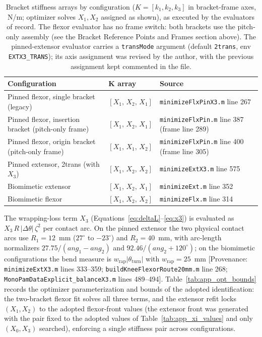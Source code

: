 \begin{table}[htbp]
\caption{Bracket stiffness arrays by configuration ($K = [k_{1}, k_{2}, k_{3}]$ in bracket-frame axes, N/m; optimizer solves $X_{1}, X_{2}$ assigned as shown), as executed by the evaluators of record. The flexor evaluator has no frame switch: both brackets use the pitch-only assembly (see the Bracket Reference Points and Frames section above). The pinned-extensor evaluator carries a \texttt{transMode} argument (default \texttt{2trans}, env \texttt{EXTX3\_TRANS}); its axis assignment was revised by the author, with the previous assignment kept commented in the file.}
\label{tab:app_stiffness_arrays}
\begin{tabular}{@{}lll@{}}
\toprule
\textbf{Configuration} & $\boldsymbol{K}$ array & \textbf{Source} \\
\midrule
Pinned flexor, single bracket (legacy)       & $[X_{1},\,X_{2},\,X_{1}]$ & \texttt{minimizeFlxPinX3.m} line 267 \\
Pinned flexor, insertion bracket (pitch-only frame)    & $[X_{1},\,X_{2},\,X_{1}]$ & \texttt{minimizeFlxPin.m} line 387 (frame line 289) \\
Pinned flexor, origin bracket (pitch-only frame) & $[X_{1},\,X_{1},\,X_{2}]$ & \texttt{minimizeFlxPin.m} line 400 (frame line 305) \\
Pinned extensor, 2trans (with $X_{3}$)      & $[X_{1},\,X_{2},\,X_{2}]$ & \texttt{minimizeExtX3.m} line 575 \\
Biomimetic extensor                 & $[X_{1},\,X_{2},\,X_{1}]$ & \texttt{minimizeExt.m} line 352 \\
Biomimetic flexor                   & $[X_{1},\,X_{2},\,X_{2}]$ & \texttt{minimizeFlx.m} line 314 \\
\bottomrule
\end{tabular}
\end{table}

The wrapping-loss term $X_{3}$ (Equations~\ref{eq:deltaL}--\ref{eq:x3}) is evaluated as $X_{3}\,R\,\lvert\Delta\theta\rvert\,\zeta^{2}$ per contact arc. On the pinned extensor the two physical contact arcs use $R_{1} = 12$~mm ($27^{\circ}$ to $-23^{\circ}$) and $R_{2} = 40$~mm, with arc-length normalizers $27.75/(ang_{1} - ang_{2})$ and $92.46/(ang_{2}+120^{\circ})$; on the biomimetic configurations the bend measure is $w_{\text{rap}}\lvert\theta_{\text{turn}}\rvert$ with $w_{\text{rap}} = 25$~mm [Provenance: \texttt{minimizeExtX3.m} lines 333--359; \texttt{buildKneeFlexorRoute20mm.m} line 268; \texttt{MonoPamDataExplicit\_balanceX3.m} lines 489--494]. Table~\ref{tab:app_opt_bounds} records the optimizer parameterization and bounds of the adopted identification: the two-bracket flexor fit solves all three terms, and the extensor refit locks $(X_{1}, X_{2})$ to the adopted flexor-front values (the extensor front was generated with the pair fixed to the adopted values of Table~\ref{tab:app_xi_values} and only $(X_{0}, X_{3})$ searched), enforcing a single stiffness pair across configurations.

